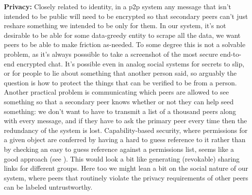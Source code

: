 \textbf{Privacy:} Closely related to identity, in a p2p system any
message that isn't intended to be public will need to be encrypted so
that secondary peers can't just reshare something we intended to be only
for them. In our system, it's not desirable to be able for some
data-greedy entity to scrape all the data, we want peers to be able to
make friction as-needed. To some degree this is not a solvable problem,
as it's always posssible to take a screenshot of the most secure
end-to-end encrypted chat. It's possible even in analog social systems
for secrets to slip, or for people to lie about something that another
person said, so arguably the question is how to protect the things that
can be verified to be from a person. Another practical problem is
communicating which peers are allowed to see something so that a
secondary peer knows whether or not they can help seed something: we
don't want to have to transmit a list of a thousand peers along with
every message, and if they have to ask the primary peer every time then
the redundancy of the system is lost. Capability-based security, where
permissions for a given object are conferred by having a hard to guess
reference to it rather than by checking an easy to guess reference
against a permissions list, seems like a good approach (see \citep{conillWhatWouldActivityPub2019} ). This would look a bit like
generating (revokable) sharing links for different groups. Here too we
might lean a bit on the social nature of our system, where peers that
routinely violate the privacy requirements of other peers can be labeled
untrustworthy.

